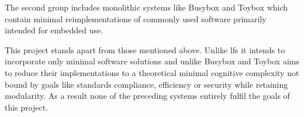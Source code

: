 The second group includes monolithic systems like Busybox \cite{busybox} and Toybox \cite{toybox} which contain minimal reimplementations of commonly used software primarily intended for embedded use.

This project stands apart from those mentioned above. Unlike \gls{lfs} it intends to incorporate only minimal software solutions and unlike Busybox and Toybox aims to reduce their implementations to a theoretical minimal cognitive complexity not bound by goals like standards compliance, efficiency or security while retaining modularity. As a result none of the preceding systems entirely fulfil the goals of this project.
